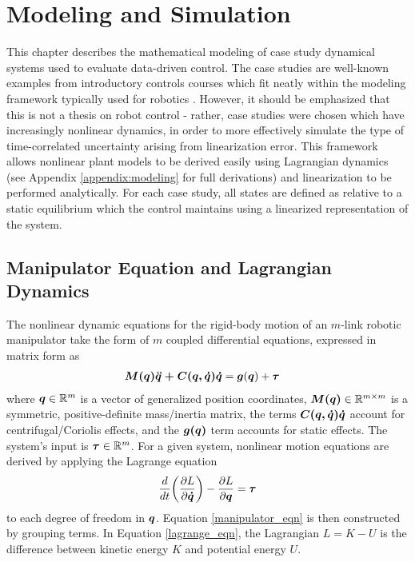 \chapter{Modeling and Simulation}
\label{chap:model}
This chapter describes the mathematical modeling of case study dynamical systems used to evaluate data-driven control.  The case studies are well-known examples from introductory controls courses which fit neatly within the modeling framework typically used for robotics \cite{sciavicco2001modelling, spong2008robot,slotineli}.  However, it should be emphasized that this is not a thesis on robot control - rather, case studies were chosen which have increasingly nonlinear dynamics, in order to more effectively simulate the type of time-correlated uncertainty arising from linearization error.  This framework allows nonlinear plant models to be derived easily using Lagrangian dynamics (see Appendix \ref{appendix:modeling} for full derivations) and linearization to be performed analytically.  For each case study, all states are defined as relative to a static equilibrium which the control maintains using a linearized representation of the system.

\section{Manipulator Equation and Lagrangian Dynamics}
The nonlinear dynamic equations for the rigid-body motion of an $m$-link robotic manipulator take the form of $m$ coupled differential equations, expressed in matrix form as
\begin{equation}
\label{manipulator_eqn}
\begin{aligned}
	\vb*{M(q)\ddot{q} + C(q, \dot{q})\dot{q}} &= \vb*{g}(\vb*{q}) + \vb*{\tau}
\end{aligned}
\end{equation}
where $\vb*{q} \in \mathbb{R}^{m}$ is a vector of generalized position coordinates, $\vb*{M(q)} \in \mathbb{R}^{m \times m}$ is a symmetric, positive-definite mass/inertia matrix, the terms $\vb*{C(q, \dot{q})\dot{q}}$ account for centrifugal/Coriolis effects, and the $\vb*{g(q)}$ term accounts for static effects.  The system's input is $\vb*{\tau} \in \mathbb{R}^{m}$.  For a given system, nonlinear motion equations are derived by applying the Lagrange equation
\begin{equation}
\label{lagrange_eqn}
\begin{aligned}
	\frac{d}{dt} \bigg{(} \frac{\partial L}{\partial \vb*{\dot{q}} } \bigg{)} - \frac{\partial L}{\partial \vb*{q}} = \vb*{\tau}
\end{aligned}
\end{equation}
to each degree of freedom in $\vb*{q}$.  Equation \eqref{manipulator_eqn} is then constructed by grouping terms.  In Equation \eqref{lagrange_eqn}, the Lagrangian $L = K - U$ is the difference between kinetic energy $K$ and potential energy $U$.

